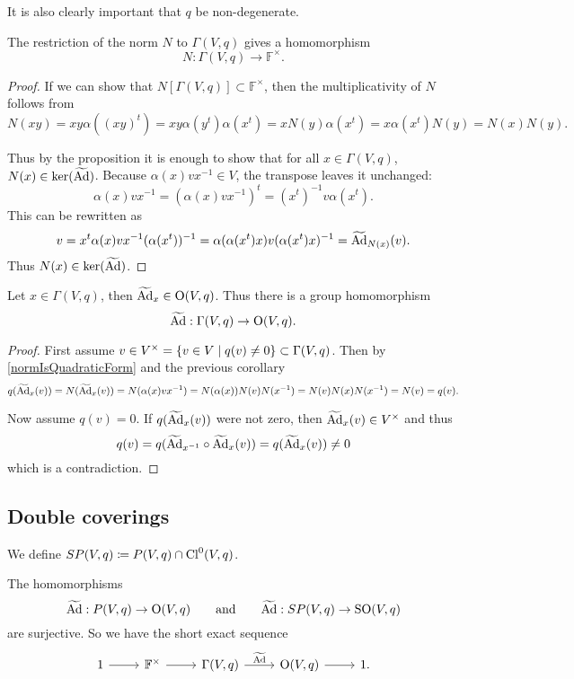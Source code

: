 It is also clearly important that $q$ be non-degenerate.

\begin{corollary} \label{normHomomorphism}
The restriction of the norm $N$ to $\Gamma(V,q)$ gives a homomorphism
\[ N: \Gamma(V,q) \to \mathbb{F}^\times. \]
\end{corollary}
\begin{proof}
If we can show that $N[\Gamma(V,q)]\subset \mathbb{F}^\times$, then the multiplicativity of $N$ follows from
\[ N(xy) = xy\alpha((xy)^t) = xy\alpha(y^t)\alpha(x^t) = xN(y)\alpha(x^t) = x\alpha(x^t)N(y) = N(x)N(y). \]

Thus by the proposition it is enough to show that for all $x\in \Gamma(V,q)$, $N(x)\in \ker(\widetilde{\operatorname{Ad}})$. Because $\alpha(x)vx^{-1}\in V$, the transpose leaves it unchanged:
\[ \alpha(x)vx^{-1} = (\alpha(x)vx^{-1})^t = (x^t)^{-1}v\alpha(x^t). \]
This can be rewritten as
\[ v = x^t\alpha(x)vx^{-1}(\alpha(x^t))^{-1} = \alpha(\alpha(x^t)x)v(\alpha(x^t)x)^{-1} = \widetilde{\operatorname{Ad}}_{N(x)}(v). \]
Thus $N(x)\in \ker(\widetilde{\operatorname{Ad}})$.
\end{proof}
\begin{corollary}
Let $x\in \Gamma(V,q)$, then $\widetilde{\operatorname{Ad}}_x \in \operatorname{O}(V,q)$. Thus there is a group homomorphism
\[ \widetilde{\operatorname{Ad}}: \Gamma(V,q) \to \operatorname{O}(V,q). \]
\end{corollary}
\begin{proof}
First assume $v\in V^\times = \setbuilder{v\in V}{q(v)\neq 0}\subset \Gamma(V,q)$. Then by \ref{normIsQuadraticForm} and the previous corollary
\[ q(\widetilde{\operatorname{Ad}}_x(v)) = N(\widetilde{\operatorname{Ad}}_x(v)) = N(\alpha(x)vx^{-1}) = N(\alpha(x))N(v)N(x^{-1}) = N(v)N(x)N(x^{-1}) = N(v) = q(v). \]

Now assume $q(v) = 0$. If $q(\widetilde{\operatorname{Ad}}_x(v))$ were not zero, then $\widetilde{\operatorname{Ad}}_x(v)\in V^\times$ and thus
\[ q(v) = q(\widetilde{\operatorname{Ad}}_{x^{-1}}\circ\widetilde{\operatorname{Ad}}_x(v)) = q(\widetilde{\operatorname{Ad}}_x(v)) \neq 0 \]
which is a contradiction.
\end{proof}

\subsection{Double coverings}
We define $SP(V,q) \coloneqq P(V,q)\cap \operatorname{Cl}^0(V,q)$.
\begin{theorem}
The homomorphisms
\[ \widetilde{\operatorname{Ad}}: P(V,q)\to \operatorname{O}(V,q) \qquad \text{and} \qquad \widetilde{\operatorname{Ad}}: SP(V,q)\to \operatorname{SO}(V,q) \]
are surjective. So we have the short exact sequence
\[ \begin{tikzcd}
1 \rar & \F^\times \rar & \Gamma(V,q) \rar{\widetilde{\Ad}} & \Ogroup(V,q) \rar & 1.
\end{tikzcd} \]
\end{theorem}

